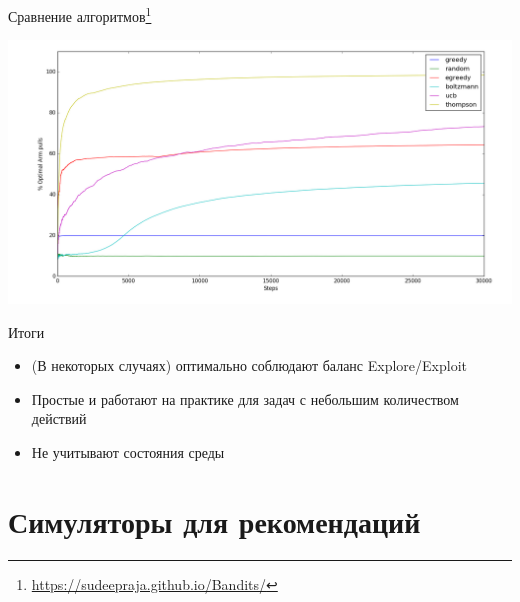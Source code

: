\documentclass[11pt,aspectratio=169,handout]{beamer}
\begin{document}
\begin{frame}{Сравнение алгоритмов\footnote{\url{https://sudeepraja.github.io/Bandits/}}}

\begin{center}
\includegraphics[scale=0.25]{images/bandits.png}
\end{center}

\end{frame}

\begin{frame}{Итоги}

\begin{tcolorbox}[colback=info!5,colframe=info!80,title=]
\begin{itemize}
\item (В некоторых случаях) оптимально соблюдают баланс Explore/Exploit
\item Простые и работают на практике для задач с небольшим количеством действий
\end{itemize}
\end{tcolorbox}

\vfill

\begin{tcolorbox}[colback=warn!5,colframe=warn!80,title=]
\begin{itemize}
\item Не учитывают состояния среды
\end{itemize}
\end{tcolorbox}

\end{frame}

\section{Симуляторы для рекомендаций}
\end{document}

